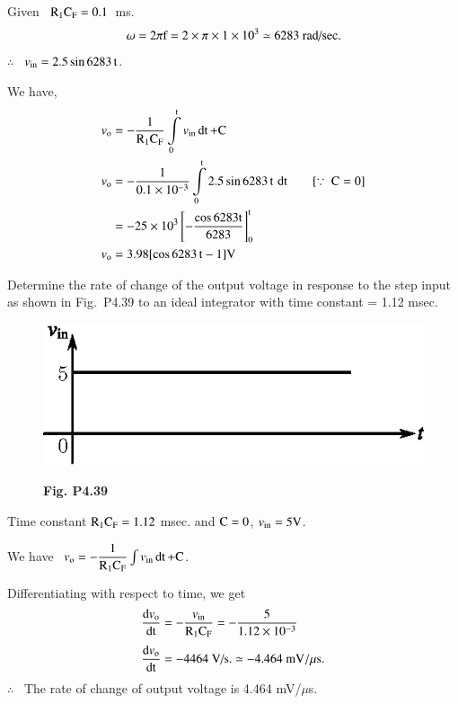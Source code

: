 \begin{solution}
Given \ $\textrm{R}_{1}\textrm{C}_{\textrm{F}}=0.1$\, ms.
$$
\omega =2\pi \textrm{f}=2\times \pi\times 1\times 10^{3}\simeq 6283\text{~rad/sec.}
$$
$\therefore$~ $v_{\text{in}}=2.5\sin 6283\,\textrm{t}$.

We have,
\begin{align*}
v_{\rmo} &= -\frac{1}{\rmR_{1}\rmC_{\rmF}}\int\limits^{\rmt}_{0}v_{\text{in}}\dt +\rmC\\
v_{\rmo} &= -\frac{1}{0.1\times 10^{-3}}\int\limits^{\rmt}_{0}2.5\sin 6283\,\rmt\,\dt\qquad [\because \ \rmC =0]\\
&=-25\times 10^{3}\left[-\frac{\cos 6283\rmt}{6283}\right]^{\rmt}_{0}\\
v_{\rmo} &= 3.98[\cos 6283\,\rmt-1]\rmV
\end{align*}
\end{solution}

\vfill\eject

\begin{problem}\label{prob4.39}
Determine the rate of change of the output voltage in response to the step input as shown in Fig.~P4.39 to an ideal integrator with time constant = 1.12 msec.
\begin{figure}[H]
\centering
\includegraphics{chap4/figP4.38.eps}

\smallskip
{\bf Fig. P4.39}
\end{figure}
\end{problem}

\begin{solution}
Time constant $\textrm{R}_{1}\textrm{C}_{\textrm{F}}=1.12$ msec. and $\textrm{C}=0$, $v_{\text{in}}=5\textrm{V}$.

\medskip
We have \ $v_{\textrm{o}}=-\dfrac{1}{\textrm{R}_{1}\textrm{C}_{\textrm{F}}}\int v_{\text{in}}\operatorname{dt} +\textrm{C}$.

\medskip
Differentiating with respect to time, we get
\begin{align*}
\dfrac{\textrm{d} v_{\textrm{o}}}{\operatorname{dt}} &= -\frac{v_{\text{in}}}{\textrm{R}_{1}\textrm{C}_{\textrm{F}}}
= -\dfrac{5}{1.12\times 10^{-3}}\\[3pt]
\dfrac{\textrm{d} v_{\textrm{o}}}{\operatorname{dt}} &= -4464\text{~V/s.}\simeq -4.464\text{~mV}/\mu\textrm{s}.
\end{align*}
$\therefore$~ The rate of change of output voltage is 4.464 mV/$\mu$s.
\end{solution}

